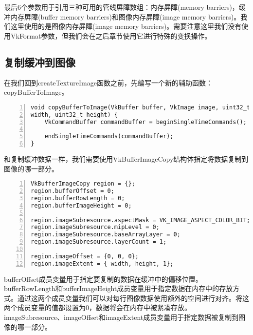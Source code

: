 \documentclass{ctexart}
\begin{document}
最后6个参数用于引用三种可用的管线屏障数组：内存屏障(memory barriers)，缓冲内存屏障(buffer memory barriers)和图像内存屏障(image memory barriers)。我们这里使用的是图像内存屏障(image memory barriers)。需要注意这里我们没有使用VkFormat参数，但我们会在之后章节使用它进行特殊的变换操作。

\subsection{复制缓冲到图像}

在我们回到createTextureImage函数之前，先编写一个新的辅助函数：copyBufferToImage。

\begin{lstlisting}[language={[ANSI]C},keywordstyle=\color{blue!70},commentstyle=\color{red!50!green!50!blue!50},frame=shadowbox, rulesepcolor=\color{red!20!green!20!blue!20},basicstyle=\small,numbers=left, numberstyle=\tiny,breaklines=true]
void copyBufferToImage(VkBuffer buffer, VkImage image, uint32_t
width, uint32_t height) {
	VkCommandBuffer commandBuffer = beginSingleTimeCommands();

	endSingleTimeCommands(commandBuffer);
}
\end{lstlisting}

和复制缓冲数据一样，我们需要使用VkBufferImageCopy结构体指定将数据复制到图像的哪一部分。

\begin{lstlisting}[language={[ANSI]C},keywordstyle=\color{blue!70},commentstyle=\color{red!50!green!50!blue!50},frame=shadowbox, rulesepcolor=\color{red!20!green!20!blue!20},basicstyle=\small,numbers=left, numberstyle=\tiny,breaklines=true]
VkBufferImageCopy region = {};
region.bufferOffset = 0;
region.bufferRowLength = 0;
region.bufferImageHeight = 0;

region.imageSubresource.aspectMask = VK_IMAGE_ASPECT_COLOR_BIT;
region.imageSubresource.mipLevel = 0;
region.imageSubresource.baseArrayLayer = 0;
region.imageSubresource.layerCount = 1;

region.imageOffset = {0, 0, 0};
region.imageExtent = { width, height, 1};
\end{lstlisting}

bufferOffset成员变量用于指定要复制的数据在缓冲中的偏移位置。bufferRowLength和bufferImageHeight成员变量用于指定数据在内存中的存放方式。通过这两个成员变量我们可以对每行图像数据使用额外的空间进行对齐。将这两个成员变量的值都设置为0，数据将会在内存中被紧凑存放。imageSubresource、imageOffset和imageExtent成员变量用于指定数据被复制到图像的哪一部分。
\end{document}
